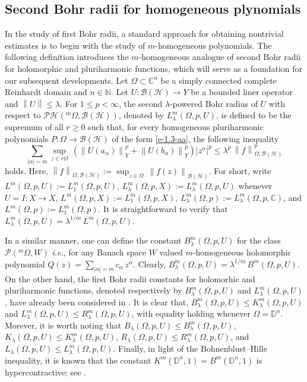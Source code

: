 \documentclass[a4paper,11pt, reqno]{amsart}
\theoremstyle{definition}
\newcounter {own}
\newcommand{\norm}[1]{\left\lVert#1\right\rVert}
\begin{document}
\subsection{Second Bohr radii for homogeneous plynomials}
In the study of first Bohr radii, a standard approach for obtaining nontrivial estimates is to begin with the study of $m$-homogeneous polynomials. The following definition introduces the $m$-homogeneous analogue of second Bohr radii for holomorphic and pluriharmonic functions, which will serve as a foundation for our subsequent developments. Let $\Omega\subset \mathbb{C}^n$ be a simply connected complete Reinhardt domain and $n\in \mathbb{N}$. Let $U:\mathcal{B}(\mathcal{H})\rightarrow Y$ be a bounded liner operator and $\norm{U} \leq \lambda$. For $1 \leq p < \infty$, the second $\lambda$-powered Bohr radius of $U$ with respect to $\mathcal{PH}(^m \Omega,\mathcal{B}(\mathcal{H}))$, denoted by $L^m_{\lambda}(\Omega, p,U)$, is defined to be the supremum of all $r\geq 0$ such that, for every homogeneous pluriharmonic polynomials $P:\Omega \rightarrow \mathcal{B}(\mathcal{H})$ of the form \eqref{e-1.3-aa}, the following inequality 
\begin{equation} \label{e-snd-3.2}
	 \sum_{|\alpha|=m} \sup_{z \in r\Omega}\, (\norm{U(a_{\alpha})}^p_{Y} + \norm{U(b_{\alpha})}^p_{Y})|z^\alpha|^p \leq \lambda^p\,\norm{f}^p_{\Omega,\mathcal{B}(\mathcal{H})} 
\end{equation}
holds. Here, $\norm{f}_{\Omega,\mathcal{B}(\mathcal{H})}:=\sup_{z \in \Omega}\,\norm{f(z)}_{\mathcal{B}(\mathcal{H})}$. For short, write $L^m(\Omega, p,U):=L^m_{1}(\Omega, p,U)$, $L^m_{\lambda}(\Omega, p,X):=L^m_{\lambda}(\Omega, p,U)$ whenever $U=I:X\rightarrow X$, $L^m(\Omega, p,X):=L^m_{1}(\Omega, p,X)$, $L^m_{\lambda}(\Omega, p):=L^m_{\lambda}(\Omega, p,\mathbb{C})$, and $L^m(\Omega,p):=L^m_1(\Omega,p)$. It is straightforward to verify that $L^m_{\lambda}(\Omega, p,U)=\lambda^{1/m}\,L^m(\Omega, p,U)$.
\par 
In a similar manner, one can define the constant $B^m_{\lambda}(\Omega, p,U)$ for the class $\mathcal{P}(^m \Omega,W)$ {\it i.e.}, for any Banach space $W$ valued $m$-homogeneous holomorphic polynomial $Q(z)=\sum_{|\alpha|=m}c_{\alpha}\, z^{\alpha}$. Clearly, $B^m_{\lambda}(\Omega, p,U)=\lambda^{1/m}\,B^m(\Omega, p,U)$. On the other hand, the first Bohr radii constants for holomorhic and pluriharmonic functions, denoted respectively by $B^m_{\lambda}(\Omega, p,U)$ and $L^m_{\lambda}(\Omega, p,U)$, have already been considered in \cite{Himadri-local-Banach-1}. It is clear that, $B^m_{\lambda}(\Omega, p,U) \leq K^m_{\lambda}(\Omega, p,U)$ and $L^m_{\lambda}(\Omega, p,U) \leq R^m_{\lambda}(\Omega, p,U)$, with equality holding whenever $\Omega=\mathbb{D}^n$. Morever, it is worth noting that $B_{\lambda}(\Omega, p,U) \leq B^m_{\lambda}(\Omega, p,U)$, $K_{\lambda}(\Omega, p,U) \leq K^m_{\lambda}(\Omega, p,U)$, $R_{\lambda}(\Omega, p,U) \leq R^m_{\lambda}(\Omega, p,U)$, and $L_{\lambda}(\Omega, p,U) \leq L^m_{\lambda}(\Omega, p,U)$. Finally, in light of the Bohnenblust–Hille inequality, it is known that the constant $K^m(\mathbb{D}^n,1)=B^m(\mathbb{D}^n,1)$ is hypercontractive; see \cite{defant-2011}.
\vspace{2mm}
\end{document}
